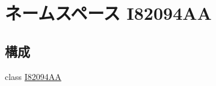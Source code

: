 \hypertarget{namespaceI82094AA}{
\section{ネームスペース I82094AA}
\label{namespaceI82094AA}
}
\subsection*{構成}
\begin{DoxyCompactItemize}
\item 
class \hyperlink{classI82094AA_1_1I82094AA}{I82094AA}
\end{DoxyCompactItemize}
